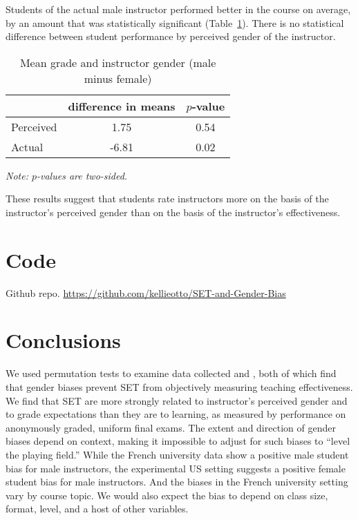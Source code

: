 \documentclass[12pt]{article}
\newcommand{\todo}[1]{{\color{red}{TO DO: \sc #1}}}
\begin{document}
Students of the actual male instructor performed better in the course on average,
by an amount that was statistically significant (Table~\ref{tab:macnell4}). 
There is no statistical difference between student performance by 
perceived gender of the instructor. 

\begin{table}[htbp]
  \centering
  \footnotesize 
  \caption{Mean grade and instructor gender (male minus female)}
    \begin{tabular}{lcc}
    \toprule 
                     & difference in means   & $p$-value    \\
   \midrule
    Perceived &         1.75       & 0.54      \\
    Actual  &            -6.81       & 0.02      \\
    \bottomrule
    \end{tabular}%
 \label{tab:macnell4}%
 
\textit{Note: $p$-values are two-sided.}
\end{table}%
\normalsize

These results suggest that students rate instructors more on the basis of the instructor's 
perceived
gender than on the basis of the instructor's effectiveness. 



\section{Code}
Github repo. \url{https://github.com/kellieotto/SET-and-Gender-Bias}
\todo{want to put this in the statlab repo?}

\section{Conclusions}

We used permutation tests to examine data collected  
\citet{Boring2015} and \citet{MacNell2014}, both of which find that gender biases prevent 
SET from objectively measuring teaching effectiveness. 
We find that SET are more strongly related to 
instructor's perceived gender and to grade expectations than they are to learning, 
as measured by performance on anonymously graded, uniform final exams. 
The extent and direction of gender biases depend on context, making it
impossible to adjust for such biases to ``level the playing field.'' 
While the French university data show a positive male student bias for male instructors, 
the experimental US setting suggests a positive female student bias for male instructors.
And the biases in the French university setting vary by course topic.
We would also expect the bias to depend on class size, format, level, and a host of other variables.
\end{document}
